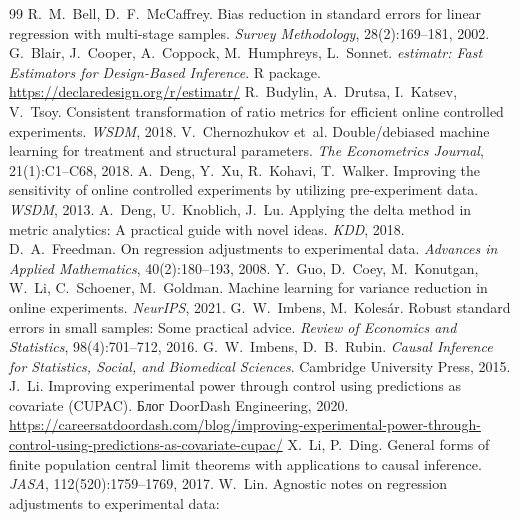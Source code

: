 \documentclass[10pt,a4paper]{article}
\begin{document}
\begin{thebibliography}{99}
 R.~M.~Bell, D.~F.~McCaffrey. Bias reduction in standard
  errors for linear regression with multi-stage samples. \emph{Survey Methodology}, 28(2):169--181, 2002.
 G.~Blair, J.~Cooper, A.~Coppock, M.~Humphreys, L.~Sonnet. \emph{estimatr:
  Fast Estimators for Design-Based Inference}. R package. \url{https://declaredesign.org/r/estimatr/}
 R.~Budylin, A.~Drutsa, I.~Katsev, V.~Tsoy. Consistent
  transformation of ratio metrics for efficient online controlled experiments. \emph{WSDM}, 2018.
 V.~Chernozhukov et~al. Double/debiased machine learning
  for treatment and structural parameters. \emph{The Econometrics Journal}, 21(1):C1--C68, 2018.
 A.~Deng, Y.~Xu, R.~Kohavi, T.~Walker. Improving the sensitivity of
  online controlled experiments by utilizing pre-experiment data. \emph{WSDM}, 2013.
 A.~Deng, U.~Knoblich, J.~Lu. Applying the delta method in metric
  analytics: A practical guide with novel ideas. \emph{KDD}, 2018.
 D.~A.~Freedman. On regression adjustments to experimental data.
  \emph{Advances in Applied Mathematics}, 40(2):180--193, 2008.
 Y.~Guo, D.~Coey, M.~Konutgan, W.~Li, C.~Schoener, M.~Goldman. Machine
  learning for variance reduction in online experiments. \emph{NeurIPS}, 2021.
 G.~W.~Imbens, M.~Kolesár. Robust standard errors in small
  samples: Some practical advice. \emph{Review of Economics and Statistics}, 98(4):701--712, 2016.
 G.~W.~Imbens, D.~B.~Rubin. \emph{Causal Inference for
  Statistics, Social, and Biomedical Sciences}. Cambridge University Press, 2015.
 J.~Li. Improving experimental power through control using predictions as
  covariate (CUPAC). Блог DoorDash Engineering, 2020.
  \url{https://careersatdoordash.com/blog/improving-experimental-power-through-control-using-predictions-as-covariate-cupac/}
 X.~Li, P.~Ding. General forms of finite population central limit
  theorems with applications to causal inference. \emph{JASA}, 112(520):1759--1769, 2017.
 W.~Lin. Agnostic notes on regression adjustments to experimental data:

\end{thebibliography}
\end{document}
